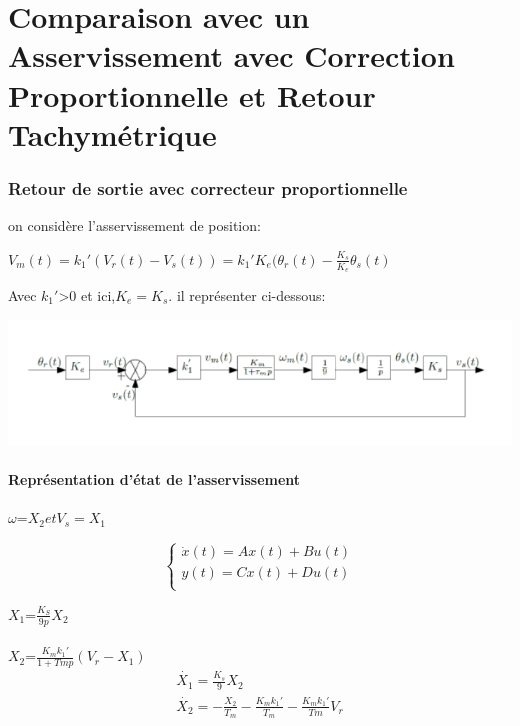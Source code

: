\chapter{Comparaison avec un Asservissement avec Correction Proportionnelle  et Retour Tachymétrique }
\subsection{Retour de sortie avec correcteur proportionnelle}

on considère l'asservissement de position:\\
\begin{center}
$V_m(t)=k_1'(V_r(t)-V_s(t))=k_1'K_e(\theta_r(t)-\frac{K_s}{K_e}\theta_s(t)$
\end{center}
Avec $k_1'$>0 et ici,$K_e=K_s$. il représenter  ci-dessous:
\\


\begin{center}
\includegraphics[scale=0.5]{fiiig3.png} 
\label{fig3}
\end{center}


\subsubsection{Représentation d'état de l'asservissement}
$\omega$=$X_2 et V_s=X_1$

\begin{equation*}
\left\{\begin{matrix}
\dot{x}(t)=Ax(t)+Bu(t)\\ 
y(t)=Cx(t)+Du(t)\\
\end{matrix}\right.
\end{equation*}   


$X_1$=$\frac{K_S}{9p}X_2$\\\\


$X_2$=$\frac{K_mk_1'}{1+Tmp}(V_r-X_1)$\\

\begin{equation*}
\begin{matrix}
\dot{X_1}=\frac{K_s}{9}X_2\\
\dot{X_2}=-\frac{X_2}{T_m}-\frac{K_mk_1'}{T_m}-\frac{K_mk_1'}{Tm}V_r
\end{matrix}
\end{equation*}
\\

